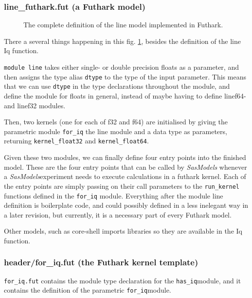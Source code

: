 \documentclass[11pt]{article}
\newcommand{\sasmodels}{\textit{SasModels}}
\newcommand{\foriq}{\texttt{for\_iq}}
\newcommand{\hasiq}{\texttt{has\_iq}}
\begin{document}
\subsubsection{line\_futhark.fut (a Futhark model)}
\label{sec:line-fut}

\begin{figure}
  
  \caption{The complete definition of the line model implemented in Futhark.}
  \label{fig:linemodel-futhark-full}
\end{figure}

There a several things happening in this fig. \ref{fig:linemodel-futhark-full}, besides the 
definition of the line Iq function.

\texttt{module line} takes either single- or double precision floats as a
parameter, and then assigns the type alias \texttt{dtype} to the type of the
input parameter. This means that we can use \texttt{dtype} in the type
declarations throughout the module, and define the module for floats in general,
instead of maybe having to define linef64- and linef32 modules.

Then, two kernels (one for each of f32 and f64) are initialised by giving
the parametric module \texttt{for\_iq} the line module and a data type 
as parameters, returning \texttt{kernel\_float32} and \texttt{kernel\_float64}.

Given these two modules, we can finally define four entry points into the
finished model. These are the four entry points that can be called by \sasmodels
whenever a \sasmodels experiment needs to execute calculations in a futhark
kernel.
Each of the entry points are simply passing on their call parameters to the 
\texttt{run\_kernel} functions defined in the \texttt{for\_iq} module.
Everything after the module line definition is boilerplate code, and could
possibly defined in a less inelegant way in a later revision, but currently, it 
is a necessary part of every Futhark model.

Other models, such as core-shell imports libraries so they are 
available in the Iq function.

\subsubsection{header/for\_iq.fut (the Futhark kernel template)}
\texttt{for\_iq.fut} contains the module type declaration for the \hasiq module,
 and it contains the definition of the parametric \foriq module. 
\end{document}
